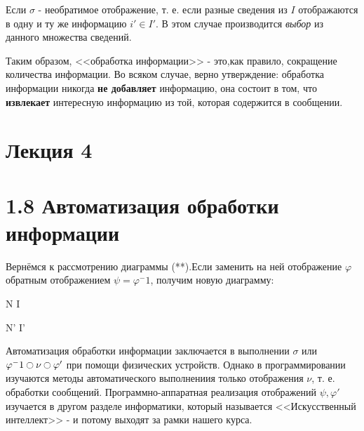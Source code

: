 \documentclass[12pt]{report}
\begin{document}
{Если $\sigma$ - необратимое отображение, т. е. если разные сведения из $I$ отображаются в одну и ту же информацию $i' \in I'$. В этом случае производится \textit{выбор} из данного множества сведений.


Таким образом, <<обработка информации>> - это,как правило, сокращение количества информации. Во всяком случае, верно утверждение: обработка информации никогда \textbf{не добавляет} информацию, она состоит в том, что \textbf{извлекает} интересную информацию из той, которая содержится в сообщении.
}


\section*{\large{Лекция 4}}


\section*{\large{1.8 Автоматизация обработки информации}}


Вернёмся к рассмотрению диаграммы (**).Если заменить на ней отображение $\varphi$ обратным отображением $\psi=\varphi^-1$, получим новую диаграмму:
\newline
\begin{math*}


    \qquad \qquad \quad N \overset{\psi}{\to} I

     
    \qquad \qquad {\nu}\shortdownarrow \qquad \shortdownarrow{\sigma}

     
   \qquad \quad \qquad N'  I' \qquad \qquad \qquad \qquad \qquad \qquad \qquad \qquad \qquad \qquad \qquad \quad
   \newline

\end{math*}
Автоматизация обработки информации заключается в выполнении $\sigma$ или $\varphi^-1 \ocircle \nu \ocircle \varphi'$ при помощи физических устройств. Однако в программировании изучаются методы автоматического выполнениия только отображения $\nu$, т. е. обработки сообщений. Программно-аппаратная реализация отображений $\psi,\varphi'$ изучается в другом разделе информатики, который называется <<Искусственный интеллект>> - и потому выходят за рамки нашего курса.
\end{document}
